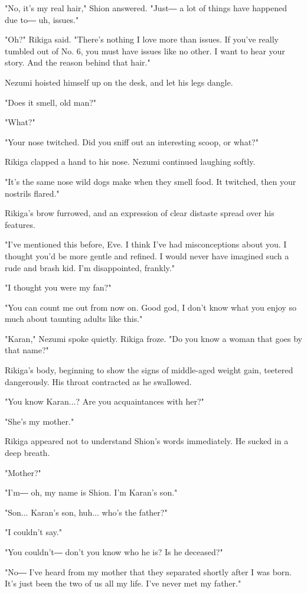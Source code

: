 "No, it's my real hair," Shion answered. "Just― a lot of things have
happened due to― uh, issues."

"Oh?" Rikiga said. "There's nothing I love more than issues. If you've
really tumbled out of No. 6, you must have issues like no other. I want
to hear your story. And the reason behind that hair."

Nezumi hoisted himself up on the desk, and let his legs dangle.

"Does it smell, old man?"

"What?"

"Your nose twitched. Did you sniff out an interesting scoop, or what?"

Rikiga clapped a hand to his nose. Nezumi continued laughing softly.

"It's the same nose wild dogs make when they smell food. It twitched,
then your nostrils flared."

Rikiga's brow furrowed, and an expression of clear distaste spread over
his features.

"I've mentioned this before, Eve. I think I've had misconceptions about
you. I thought you'd be more gentle and refined. I would never have
imagined such a rude and brash kid. I'm disappointed, frankly."

"I thought you were my fan?"

"You can count me out from now on. Good god, I don't know what you enjoy
so much about taunting adults like this."

"Karan," Nezumi spoke quietly. Rikiga froze. "Do you know a woman that
goes by that name?"

Rikiga's body, beginning to show the signs of middle-aged weight gain,
teetered dangerously. His throat contracted as he swallowed.

"You know Karan...? Are you acquaintances with her?"

"She's my mother."

Rikiga appeared not to understand Shion's words immediately. He sucked
in a deep breath.

"Mother?"

"I'm― oh, my name is Shion. I'm Karan's son."

"Son... Karan's son, huh... who's the father?"

"I couldn't say."

"You couldn't― don't you know who he is? Is he deceased?"

"No― I've heard from my mother that they separated shortly after I was
born. It's just been the two of us all my life. I've never met my
father."

